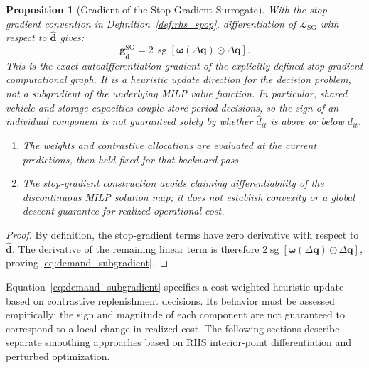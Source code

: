 \documentclass[11pt,a4paper]{article}
\newtheorem{proposition}{Proposition}
\theoremstyle{definition}
\theoremstyle{remark}
\begin{document}
\begin{proposition}[Gradient of the Stop-Gradient Surrogate]
\label{prop:demand_gradient}
With the stop-gradient convention in Definition~\ref{def:rhs_spop}, differentiation of $\mathcal{L}_{\text{SG}}$ with respect to $\hat{\mathbf{d}}$ gives:
\begin{equation}
    \mathbf{g}_{\hat{\mathbf{d}}}^{\text{SG}} = 2 \, \operatorname{sg}\!\left[\boldsymbol{\omega}(\Delta \mathbf{q}) \odot \Delta \mathbf{q}\right]. \label{eq:demand_subgradient}
\end{equation}
This is the exact autodifferentiation gradient of the explicitly defined stop-gradient computational graph. It is a heuristic update direction for the decision problem, not a subgradient of the underlying MILP value function. In particular, shared vehicle and storage capacities couple store-period decisions, so the sign of an individual component is not guaranteed solely by whether $\hat d_{it}$ is above or below $d_{it}$.
\begin{enumerate}[label=(\roman*)]
    \item The weights and contrastive allocations are evaluated at the current predictions, then held fixed for that backward pass.
    \item The stop-gradient construction avoids claiming differentiability of the discontinuous MILP solution map; it does not establish convexity or a global descent guarantee for realized operational cost.
\end{enumerate}
\end{proposition}

\begin{proof}
By definition, the stop-gradient terms have zero derivative with respect to $\hat{\mathbf{d}}$. The derivative of the remaining linear term is therefore $2\operatorname{sg}[\boldsymbol{\omega}(\Delta\mathbf{q})\odot\Delta\mathbf{q}]$, proving \eqref{eq:demand_subgradient}.
\end{proof}

Equation~\eqref{eq:demand_subgradient} specifies a cost-weighted heuristic update based on contrastive replenishment decisions. Its behavior must be assessed empirically; the sign and magnitude of each component are not guaranteed to correspond to a local change in realized cost. The following sections describe separate smoothing approaches based on RHS interior-point differentiation and perturbed optimization.
\end{document}
